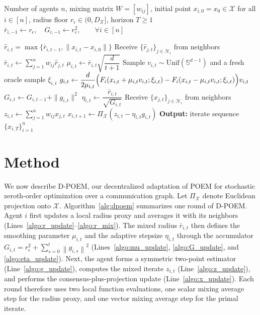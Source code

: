 \documentclass[runningheads]{llncs}
\newcommand{\norm}[1]{\left\lVert #1 \right\rVert}
\begin{document}
\begin{algorithm}[t]
\caption{Decentralized POEM (D-POEM)}
\label{alg:dpoem}
\begin{algorithmic}[1]
\Require Number of agents $n$, mixing matrix $W=[w_{ij}]$, initial point $x_{i,0}=x_0\in\mathcal{X}$ for all $i\in[n]$, radius floor $r_\epsilon\in(0,D_{\mathcal{X}}]$, horizon $T\ge 1$
\State $\bar r_{i,-1}\gets r_\epsilon,\quad G_{i,-1}\gets r_\epsilon^2,\qquad \forall i\in[n]$


        \State $\hat r_{i,t} = \max\{\bar r_{i,t-1},\|x_{i,t} - x_{i,0} \| \}$ \label{algo:r_update}
        \State Receive $\{\hat r_{j,t}\}_{j\in\mathcal N_i}$ from neighbors
        \State $\bar r_{i,t} \gets \sum_{j=1}^n w_{ij}\hat r_{j,t}$ \label{algo:r_mix}
        \State $\mu_{i,t} \gets \bar r_{i,t} \sqrt{\dfrac{d}{t+1}}$ \label{algo:mu_update}
        \State Sample $v_{i,t}\sim \mathrm{Unif}(\mathbb S^{d-1})$ and a fresh oracle sample $\xi_{i,t}$
        \State  $
        g_{i,t}\gets
        \dfrac{d}{2\mu_{i,t}}
        \Bigl(
        F_i(x_{i,t}+\mu_{i,t} v_{i,t};\xi_{i,t})
        -
        F_i(x_{i,t}-\mu_{i,t} v_{i,t};\xi_{i,t})
        \Bigr)v_{i,t}
        $ \label{algo:g_update}
        \State $G_{i,t}\gets G_{i,t-1}+\|g_{i,t}\|^2$ \label{algo:G_update}
        \State $\eta_{i,t}\gets \dfrac{\bar r_{i,t}}{\sqrt{G_{i,t}}}$   \label{algo:eta_update}  
        \State Receive $\{x_{j,t}\}_{j\in\mathcal N_i}$ from neighbors
        \State $z_{i,t}\gets \sum_{j=1}^n w_{ij}x_{j,t}$ \label{algo:z_update}
        \State  $
        x_{i,t+1}\gets
        \Pi_{\mathcal{X}}\!\left(
            z_{i,t}
            -
            \eta_{i,t}g_{i,t}
        \right)
        $ \label{algo:x_update}
    \EndFor
\EndFor
\State \textbf{Output:} iterate sequence $\{x_{i,T}\}_{i=1}^n$
\end{algorithmic}
\end{algorithm}

\section{Method}

We now describe D-POEM, our decentralized adaptation of POEM for stochastic
zeroth-order optimization over a communication graph. Let \(\Pi_{\mathcal{X}}\)
denote Euclidean projection onto \(\mathcal{X}\). Algorithm~\ref{alg:dpoem}
summarizes one round of D-POEM. Agent \(i\) first updates a local radius proxy
and averages it with its neighbors (Lines~\ref{algo:r_update}--\ref{algo:r_mix}).
The mixed radius \(\bar r_{i,t}\) then defines the smoothing parameter
\(\mu_{i,t}\) and the adaptive stepsize \(\eta_{i,t}\) through the accumulator
\(G_{i,t}=r_\epsilon^2+\sum_{s=0}^t \norm{g_{i,s}}^2\)
(Lines~\ref{algo:mu_update}, \ref{algo:G_update}, and
\ref{algo:eta_update}). Next, the agent forms a symmetric two-point estimator
(Line~\ref{algo:g_update}), computes the mixed iterate \(z_{i,t}\)
(Line~\ref{algo:z_update}), and performs the consensus-plus-projection update
(Line~\ref{algo:x_update}). Each round therefore uses two local function
evaluations, one scalar mixing average step for the radius proxy, and one
vector mixing average step for the primal iterate.
\end{document}
